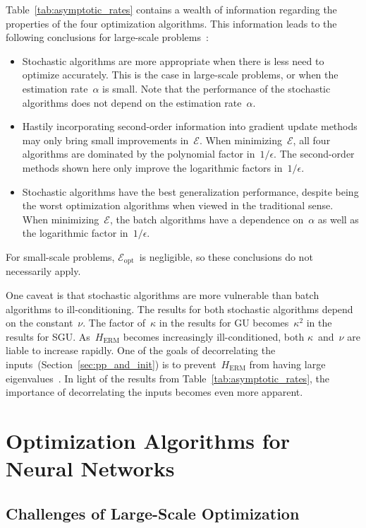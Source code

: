 \documentclass[11pt,a4paper]{article}
\numberwithin{equation}{section}
\newcommand{\opterr}{\mathcal{E}_{\mathrm{opt}}}
\begin{document}
Table~\ref{tab:asymptotic_rates} contains a wealth of information regarding the
properties of the four optimization algorithms. This information leads to the
following conclusions for large-scale problems~\citep{bousquet2008tradeoffs}:
\begin{itemize}
\item Stochastic algorithms are more appropriate when there is less need to
optimize accurately. This is the case in large-scale problems, or when the
estimation rate~$\alpha$ is small. Note that the performance of the stochastic
algorithms does not depend on the estimation rate~$\alpha$.

\item Hastily incorporating second-order information into gradient update
methods may only bring small improvements in~$\mathcal{E}$. When
minimizing~$\mathcal{E}$, all four algorithms are dominated by the polynomial
factor in~$1/\epsilon$. The second-order methods shown here only improve the
logarithmic factors in~$1/\epsilon$.

\item Stochastic algorithms have the best generalization performance, despite
being the worst optimization algorithms when viewed in the traditional sense.
When minimizing~$\mathcal{E}$, the batch algorithms have a dependence
on~$\alpha$ as well as the logarithmic factor in~$1/\epsilon$.
\end{itemize}
For small-scale problems, $\opterr$~is negligible, so these conclusions do not
necessarily apply.

One caveat is that stochastic algorithms are more vulnerable than batch
algorithms to ill-conditioning. The results for both stochastic algorithms
depend on the constant~$\nu$. The factor of~$\kappa$ in the results for GU
becomes~$\kappa^2$ in the results for SGU. As~$H_{\text{ERM}}$ becomes
increasingly ill-conditioned, both $\kappa$~and~$\nu$ are liable to increase
rapidly. One of the goals of decorrelating the
inputs~(Section~\ref{sec:pp_and_init}) is to prevent~$H_{\text{ERM}}$ from
having large eigenvalues~\citep{lecun-98b}. In light of the results from
Table~\ref{tab:asymptotic_rates}, the importance of decorrelating the inputs
becomes even more apparent.

\section{Optimization Algorithms for Neural Networks}

\subsection{Challenges of Large-Scale Optimization}
\end{document}
